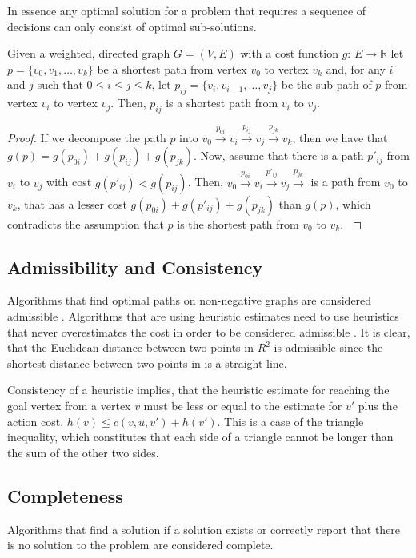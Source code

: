 In essence any optimal solution for a problem that requires a sequence of decisions can only consist of optimal sub-solutions.

\begin{lemma}
    Given a weighted, directed graph $G = (V,E)$ with a cost function $g$: $E \rightarrow \mathbb{R}$ let $p = \{v_0, v_1,\ldots, v_k\}$ be a shortest path from vertex $v_0$ to vertex $v_k$ and, for any $i$ and $j$ such that $0 \leq i \leq j \leq k$, let $p_{ij} = \{v_i, v_{i+1},\ldots, v_j\}$ be the sub path of $p$ from vertex $v_i$ to vertex $v_j$. Then, $p_{ij}$ is a shortest path from $v_i$ to $v_j$.
\end{lemma}
 
\begin{proof}
    If we decompose the path $p$ into $v_0 \xrightarrow{p_{0i}} v_i \xrightarrow{p_{ij}} v_j \xrightarrow{p_{jk}} v_k$, then we have that $g(p) = g(p_{0i}) + g(p_{ij}) + g(p_{jk})$. Now, assume that there is a path $p'_{ij}$ from $v_i$ to $v_j$ with cost $g(p'_{ij}) < g(p_{ij})$. Then, $v_0 \xrightarrow{p_{0i}} v_i \xrightarrow{p'_{ij}} v_j \xrightarrow{p_{jk}}$ is a path from $v_0$ to $v_k$, that has a lesser cost $g(p_{0i}) + g(p'_{ij}) + g(p_{jk})$ than $g(p)$, which contradicts the assumption that $p$ is the shortest path from $v_0$ to $v_k$. \cite{Cormen.2009}
\end{proof}

\subsection{Admissibility and Consistency}
Algorithms that find optimal paths on non-negative graphs are considered admissible \cite{Hart.1968}. Algorithms that are using heuristic estimates need to use heuristics that never overestimates the cost in order to be considered admissible \cite{Russell.2010}. It is clear, that the Euclidean distance between two points in $R^2$ is admissible since the shortest distance between two points in is a straight line.

Consistency of a heuristic implies, that the heuristic estimate for reaching the goal vertex from a vertex $v$ must be less or equal to the estimate for $v'$ plus the action cost,  $h(v) \leq c(v, u, v')+ h(v')$. This is a case of the triangle inequality, which constitutes that each side of a triangle cannot be longer than the sum of the other two sides. \cite{Russell.2010}

\subsection{Completeness}
Algorithms that find a solution if a solution exists or correctly report that there is no solution to the problem are considered complete. \cite{LaValle.2006,Russell.2010}

